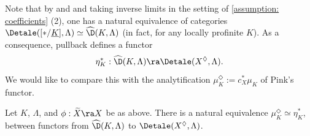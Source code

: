 \documentclass[letterpaper,11pt]{amsart}
\begin{document}
Note that by \cite[Lemma~10.5]{Mann2022NuclearSheaves} and \cite[Proposition 3.20]{Mann2022NuclearSheaves} and taking inverse limits in the setting of \ref{assumption: coefficients} (2), one has a natural equivalence of categories $\Detale([\ast/\underline{K}],\Lambda) \simeq \widehat{\D}(K,\Lambda)$ (in fact, for any locally profinite $K$). As a consequence, pullback defines a functor 
\[ \eta_{K}^{\ast}: \widehat{\D}(K,\Lambda) \ra \Detale(X^{\Diamond},\Lambda). \]
We would like to compare this with the analytification $\mu_{K}^{\Diamond} := c_{X}^{*}\mu_{K}$ of Pink's functor. 

\begin{lemma}\label{lemma: ComparisonbetweenPinksFunctorandClassifyingStack}
Let $K$, $\Lambda$, and $\phi: \widetilde{X} \ra X$ be as above. There is a natural equivalence $\mu_{K}^{\Diamond} \simeq \eta_{K}^{*}$, between functors from $\widehat{\D}(K,\Lambda)$ to $\Detale(X^\Diamond,\Lambda)$.
\end{lemma}
\end{document}
